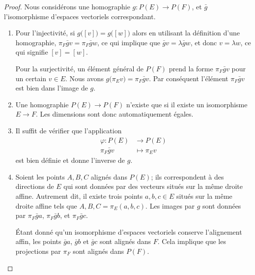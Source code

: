 \begin{proof}
    Nous considérons une homographie \( g\colon P(E)\to P(F)\), et \( \bar g\) l'isomorphisme d'espaces vectoriels correspondant.
    \begin{enumerate}
        \item
            Pour l'injectivité, si \( g\big( [v] \big)=g\big( [w] \big)\) alors en utilisant la définition d'une homographie, \( \pi_F\bar gv=\pi_F\bar gw\), ce qui implique que \( \bar gv=\lambda\bar gw\), et donc \( v=\lambda w\), ce qui signifie \( [v]=[w]\).

            Pour la surjectivité, un élément général de \( P(F)\) prend la forme \( \pi_F\bar gv\) pour un certain \( v\in E\). Nous avons \( g\big( \pi_Ev \big)=\pi_F\bar gv\). Par conséquent l'élément \( \pi_F\bar gv\) est bien dans l'image de \( g\).

        \item
            Une homographie \( P(E)\to P(F)\) n'existe que si il existe un isomorphisme \( E\to F\). Les dimensions sont donc automatiquement égales.
        \item
            Il suffit de vérifier que l'application
            \begin{equation}
                \begin{aligned}
                    \varphi\colon P(E)&\to P(E) \\
                    \pi_F\bar gv&\mapsto \pi_Ev
                \end{aligned}
            \end{equation}
            est bien définie et donne l'inverse de \( g\).
        \item
            Soient les points \( A,B,C\) alignés dans \( P(E)\); ils correspondent à des directions de \( E\) qui sont données par des vecteurs situés sur la même droite affine. Autrement dit, il existe trois points \( a,b,c\in E\) situés sur la même droite affine tels que \( A,B,C=\pi_E(a,b,c)\). Les images par \( g\) sont données par \( \pi_F\bar ga\), \( \pi_F\bar gb\), et \( \pi_F\bar gc\).

            Étant donné qu'un isomorphisme d'espaces vectoriels conserve l'alignement affin, les points \( \bar ga\), \( \bar gb\) et \( \bar gc\) sont alignés dans \( F\). Cela implique que les projections par \( \pi_F\) sont alignés dans \( P(F)\).
    \end{enumerate}
\end{proof}

